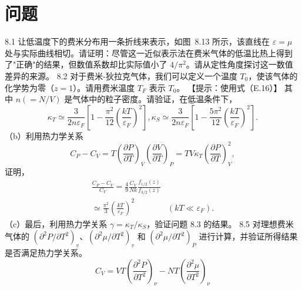 \section{问题}\label{ux95eeux9898_chap8}
8.1 让低温度下的费米分布用一条折线来表示，如图~8.13 所示，该直线在 \(\varepsilon=\mu\) 处与实际曲线相切。请证明：尽管这一近似表示法在费米气体的低温比热上得到了"正确"的结果，但数值系数却比实际值小了 \(4/\pi^2\)。请从定性角度探讨这一数值差异的来源。
8.2 对于费米-狄拉克气体，我们可以定义一个温度 \(T_0\)，使该气体的化学势为零（\(z=1\)）。请用费米温度 \(T_F\) 表示 \(T_0\)。
【提示：使用式（E.16）】
其中 \(n(=N/V)\) 是气体中的粒子密度。请验证，在低温条件下，
\begin{equation}\tag{8.2.21}\label{eq:8.2.21}
\kappa _ { T } \simeq \frac { 3 } { 2 n \varepsilon _ { F } } \left[ 1 - \frac { \pi ^{2} } { 12 } \left( \frac { k T } { \varepsilon _ { F } } \right) ^{2} \right] ,  \kappa _ { S } \simeq \frac { 3 } { 2 n \varepsilon _ { F } } \left[ 1 - \frac { 5 \pi ^{2} } { 12 } \left( \frac { k T } { \varepsilon _ { F } } \right) ^{2} \right] .
\end{equation}
（b）利用热力学关系
\begin{equation}\tag{8.2.22}\label{eq:8.2.22}
C _ { P } - C _ { V } = T \left( \frac { \partial P } { \partial T } \right) _ { V } \left( \frac { \partial V } { \partial T } \right) _ { P } = T V \kappa _ { T } \left( \frac { \partial P } { \partial T } \right) _ { V } ^{2} ,
\end{equation}
证明，
\begin{equation}\tag{8.2.23}\label{eq:8.2.23}
\begin{array}{rl} { \frac { C _ { P } - C _ { V } } { C _ { V } } = \frac { 4 } { 9 } \frac { C _ { V } } { N k } \frac { f _ { 1 / 2 } ( z ) } { f _ { 3 / 2 } ( z ) } } & { } \\{ \simeq \frac { \pi ^{2} } { 3 } \left( \frac { k T } { \varepsilon _ { F } } \right) ^{2} } & { ( k T \ll \varepsilon _ { F } ) . } \end{array}
\end{equation}
（c）最后，利用热力学关系 \(\gamma = \kappa_T / \kappa_S\)，验证问题 8.3 的结果。
8.5 对理想费米气体的 \((\partial^2P/\partial T^2)_v\)、\((\partial^2\mu/\partial T^2)_v\) 和 \((\partial^2\mu/\partial T^2)_P\) 进行计算，并验证所得结果是否满足热力学关系。
\begin{equation}\tag{8.5.1}\label{eq:8.5.1}
C _ { V } = V T \left( \frac { \partial ^{2} P } { \partial T ^{2} } \right) _ { \nu } - N T \left( \frac { \partial ^{2} \mu } { \partial T ^{2} } \right) _ { \nu }
\end{equation}
